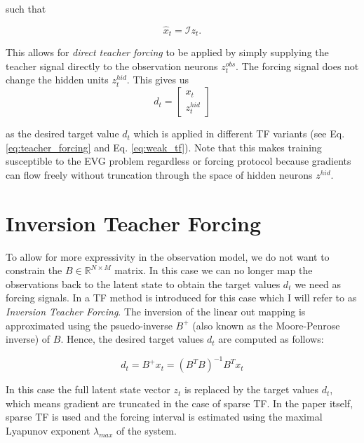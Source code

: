 such that 

\begin{equation}
    \hat{x}_t = \mathcal{I}z_t.
    \label{eq:ident_obs}
\end{equation}

This allows for \textit{direct teacher forcing} to be applied by simply supplying the teacher signal directly to the observation neurons $z_t^{obs}$. The forcing signal 
does not change the hidden units $z_t^{hid}$. This gives us 
\begin{equation}
    d_t = \begin{bmatrix}
        x_t \\
        z_t^{hid}
    \end{bmatrix}
    \label{eq:indent_tf}
\end{equation}

as the desired target value $d_t$ which is applied in different TF variants (see Eq. \ref{eq:teacher_forcing} and Eq. \ref{eq:weak_tf}).
Note that this makes training susceptible to the EVG problem regardless or forcing protocol because gradients can flow freely without truncation through the space of hidden
neurons $z^{hid}$.

\section{Inversion Teacher Forcing}

To allow for more expressivity in the observation model, we do not want to constrain the $B \in \mathbb{R}^{N \times M}$ matrix. In this case we can no longer map the observations
back to the latent state to obtain the target values $d_t$ we need as forcing signals. In \cite{mikhaeil2022difficulty} a TF method is introduced for this case which 
I will refer to as \textit{Inversion Teacher Forcing}. The inversion of the linear out mapping is approximated using the psuedo-inverse $B^{+}$ 
(also known as the Moore-Penrose inverse) of $B$. Hence, the desired target values $d_t$ are computed as follows:

\begin{equation}
    d_t = B^{+}x_t = (B^{T}B)^{-1}B^T x_t
    \label{eq:inversion_tf}
\end{equation}

In this case the full latent state vector $z_t$ is replaced by the target values $d_t$, which means gradient are truncated in the case of sparse TF. In the paper 
\cite{mikhaeil2022difficulty} itself, sparse TF is used and the forcing interval is estimated using the maximal Lyapunov exponent $\lambda_{max}$ of the system.

